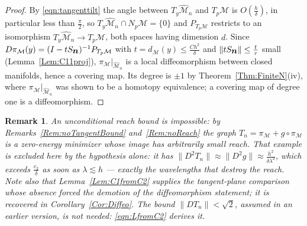 \documentclass[11pt]{amsart}%
\theoremstyle{plain}
\newtheorem{remark}[definition]{Remark}
\def\nn{\mbox{\boldmath $n$}}
\newcommand{\1}{\mathbf{1}}
\newcommand{\M}{\mathcal{M}}
\begin{document}
\begin{proof}
    By \eqref{eqn:tangenttilt} the angle between $T_y\widehat{\M}_n$ and $T_p\M$ is $O\left(\frac{h}{\delta}\right)$,
    in particular less than $\frac{\pi}{2}$, so $T_y\widehat{\M}_n\cap N_p\M=\{0\}$ and $P_{T_p\M}$
    restricts to an isomorphism $T_y\widehat{\M}_n\to T_p\M$, both spaces having dimension $d$.
    Since $D\pi_\M(y)=(I-tS_{\nn})^{-1}P_{T_p\M}$ with $t=d_\M(y)\le \frac{Ch^2}{\delta}$ and
    $\|tS_{\nn}\|\le \frac{t}{\tau}$ small (Lemma~\ref{Lem:C11proj}), $\pi_\M|_{\widehat{\M}_n}$ is
    a local diffeomorphism between closed manifolds, hence a covering map. Its degree is $\pm1$ by
    Theorem~\ref{Thm:FiniteN}(iv), where $\pi_\M|_{\widehat{\M}_n}$ was shown to be a homotopy
    equivalence; a covering map of degree one is a diffeomorphism.
\end{proof}

\begin{remark}
    An unconditional reach bound is impossible: by Remarks~\ref{Rem:noTangentBound}
    and~\ref{Rem:noReach} the graph $T_n=\pi_\M+g\circ\pi_\M$ is a zero-energy minimizer whose image
    has arbitrarily small reach. That example is excluded here by the hypothesis alone: it has
    $\|D^2T_n\|\approx\|D^2g\|\approx\frac{h^2}{\delta\lambda^2}$, which exceeds $\frac{c_2}{\delta}$ as soon as
    $\lambda\lesssim h$ --- exactly the wavelengths that destroy the reach. Note also that
    Lemma~\ref{Lem:C1fromC2} supplies the tangent-plane comparison whose absence forced the
    demotion of the diffeomorphism statement; it is recovered in Corollary~\ref{Cor:Diffeo}. The
    bound $\|DT_n\|<\sqrt2$, assumed in an earlier version, is not needed: \eqref{eqn:LfromC2}
    derives it.
\end{remark}
\end{document}
